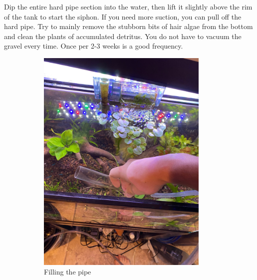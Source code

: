 \documentclass{report}
\begin{document}
Dip the entire hard pipe section into the water, then lift it slightly above the rim of the tank to start the siphon. If you 
need more suction, you can pull off the hard pipe. Try to mainly remove the stubborn bits of hair algae from the bottom and 
clean the plants of accumulated detritus. You do not have to vacuum the gravel every time. Once per 2-3 weeks is a good frequency. 

\begin{figure}[H]
    \centering
    \begin{subfigure}{0.5\textwidth}
        \centering
        \includegraphics[width=0.9\textwidth, angle=-90]{StartSiphon1.jpg}
        \caption{Filling the pipe}
    \end{subfigure}%
    \begin{subfigure}{0.5\textwidth}
        \centering

\end{subfigure}
\end{figure}
\end{document}
